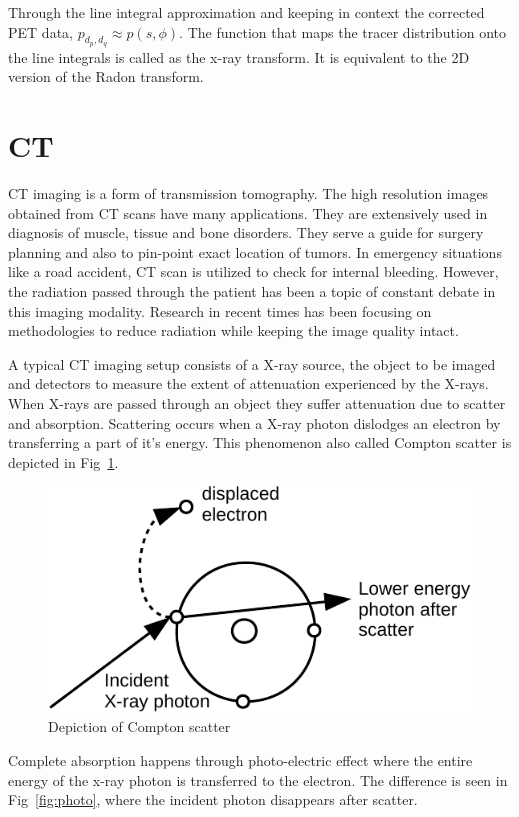 Through the line integral approximation and keeping in context the corrected \ac{PET} data, $p_{d_{p},d_{q}}\approx p(s,\phi)$. The function that maps the tracer distribution onto the line integrals is called as the x-ray transform. It is equivalent to the 2D version of the Radon transform. 

\section{CT}

\ac{CT} imaging is a form of transmission tomography. The high resolution images obtained from \ac{CT} scans have many applications. They are extensively used in diagnosis of muscle, tissue and bone disorders. They serve a guide for surgery planning and also to pin-point exact location of tumors. In emergency situations like a road accident, \ac{CT} scan is utilized to check for internal bleeding. However, the radiation passed through the patient has been a topic of constant debate in this imaging modality. Research in recent times has been focusing on methodologies to reduce radiation while keeping the image quality intact. 


A typical \ac{CT} imaging setup consists of a X-ray source, the object to be imaged and detectors to measure the extent of attenuation experienced by the X-rays. When X-rays are passed through an object they suffer attenuation due to scatter and absorption. Scattering occurs when a X-ray photon dislodges an electron by transferring a part of it's energy. This phenomenon also called Compton scatter is depicted in Fig~\ref{fig:com}. 
\begin{figure}[!htbp]
	\centering
	\includegraphics[width=0.7\linewidth]{./Figures/compton-crop.pdf}
	\caption{Depiction of Compton scatter}
	\label{fig:com}
\end{figure}

Complete absorption happens through photo-electric effect where the entire energy of the x-ray photon is transferred to the electron. The difference is seen in Fig~\ref{fig:photo}, where the incident photon disappears after scatter. 

